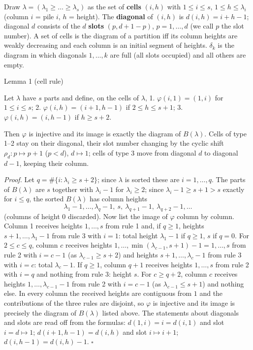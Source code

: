 Draw \(\lambda=(\lambda_1\ge\dots\ge\lambda_s)\) as the set of
\textbf{cells} \((i,h)\) with \(1\le i\le s\), \(1\le h\le\lambda_i\)
(column \(i\) = pile \(i\), \(h\) = height). The \textbf{diagonal} of
\((i,h)\) is \(d(i,h)=i+h-1\); diagonal \(d\) consists of the \(d\)
\textbf{slots} \((p,d+1-p)\), \(p=1,\dots,d\) (we call \(p\) the slot
number). A set of cells is the diagram of a partition iff its column
heights are weakly decreasing and each column is an initial segment of
heights. \(\delta_k\) is the diagram in which diagonals \(1,\dots,k\)
are full (all slots occupied) and all others are empty.

Lemma 1 (cell rule)

Let \(\lambda\) have \(s\) parts and define, on the cells of
\(\lambda\), 1. \(\varphi(i,1)=(1,i)\) for \(1\le i\le s\); 2.
\(\varphi(i,h)=(i+1,h-1)\) if \(2\le h\le s+1\); 3.
\(\varphi(i,h)=(i,h-1)\) if \(h\ge s+2\).

Then \(\varphi\) is injective and its image is exactly the diagram of
\(B(\lambda)\). Cells of type 1--2 stay on their diagonal, their slot
number changing by the cyclic shift \(\rho_d:p\mapsto p+1\) (\(p<d\)),
\(d\mapsto 1\); cells of type 3 move from diagonal \(d\) to diagonal
\(d-1\), keeping their column.

\emph{Proof.} Let \(q=\#\{i:\lambda_i\ge s+2\}\); since \(\lambda\) is
sorted these are \(i=1,\dots,q\). The parts of \(B(\lambda)\) are \(s\)
together with \(\lambda_i-1\) for \(\lambda_i\ge 2\); since
\(\lambda_i-1\ge s+1>s\) exactly for \(i\le q\), the sorted
\(B(\lambda)\) has column heights
\[\lambda_1-1,\dots,\lambda_q-1,\ s,\ \lambda_{q+1}-1,\ \lambda_{q+2}-1,\dots\]
(columns of height \(0\) discarded). Now list the image of \(\varphi\)
column by column. Column 1 receives heights \(1,\dots,s\) from rule 1
and, if \(q\ge1\), heights \(s+1,\dots,\lambda_1-1\) from rule 3 with
\(i=1\): total height \(\lambda_1-1\) if \(q\ge1\), \(s\) if \(q=0\).
For \(2\le c\le q\), column \(c\) receives heights
\(1,\dots,\min(\lambda_{c-1},s+1)-1=1,\dots,s\) from rule 2 with
\(i=c-1\) (as \(\lambda_{c-1}\ge s+2\)) and heights
\(s+1,\dots,\lambda_c-1\) from rule 3 with \(i=c\): total
\(\lambda_c-1\). If \(q\ge1\), column \(q+1\) receives heights
\(1,\dots,s\) from rule 2 with \(i=q\) and nothing from rule 3: height
\(s\). For \(c\ge q+2\), column \(c\) receives heights
\(1,\dots,\lambda_{c-1}-1\) from rule 2 with \(i=c-1\) (as
\(\lambda_{c-1}\le s+1\)) and nothing else. In every column the received
heights are contiguous from \(1\) and the contributions of the three
rules are disjoint, so \(\varphi\) is injective and its image is
precisely the diagram of \(B(\lambda)\) listed above. The statements
about diagonals and slots are read off from the formulas:
\(d(1,i)=i=d(i,1)\) and slot \(i=d\mapsto 1\); \(d(i+1,h-1)=d(i,h)\) and
slot \(i\mapsto i+1\); \(d(i,h-1)=d(i,h)-1\). \(\square\)

